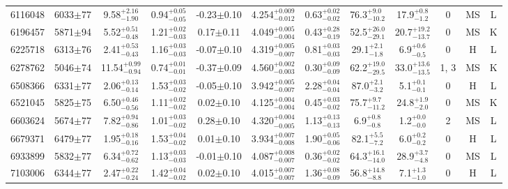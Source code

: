 \begin{longtable}{c|ccccc|ccc|ccc}
6116048 & 6033$\pm$77    & 9.58$_{-1.90}^{+2.16}$    & 0.94$_{-0.05}^{+0.05}$ & -0.23$\pm$0.10    & 4.254$_{-0.012}^{+0.009}$ & 0.63$_{-0.02}^{+0.02}$ & 76.3$_{-10.2}^{+9.0}$     & 17.9$_{-1.2}^{+0.8}$     & 0 &        MS & L \\
6196457 & 5871$\pm$94    & 5.52$_{-0.48}^{+0.51}$    & 1.21$_{-0.03}^{+0.02}$ & 0.17$\pm$0.11     & 4.049$_{-0.004}^{+0.005}$ & 0.43$_{-0.19}^{+0.28}$ & 52.5$_{-29.1}^{+26.0}$    & 20.7$_{-13.7}^{+19.2}$   & 0 &        MS & K \\
6225718 & 6313$\pm$76    & 2.41$_{-0.43}^{+0.53}$    & 1.16$_{-0.03}^{+0.03}$ & -0.07$\pm$0.10    & 4.319$_{-0.007}^{+0.005}$ & 0.81$_{-0.03}^{+0.03}$ & 29.1$_{-1.8}^{+2.1}$      & 6.9$_{-0.5}^{+0.6}$      & 0 &        H & L \\
6278762 & 5046$\pm$74    & 11.54$_{-0.94}^{+0.99}$   & 0.74$_{-0.01}^{+0.01}$ & -0.37$\pm$0.09    & 4.560$_{-0.003}^{+0.002}$ & 0.30$_{-0.09}^{+0.09}$ & 62.2$_{-29.5}^{+19.0}$    & 33.0$_{-13.5}^{+13.6}$   & 1, 3 &        MS & K \\
6508366 & 6331$\pm$77    & 2.06$_{-0.14}^{+0.13}$    & 1.53$_{-0.02}^{+0.03}$ & -0.05$\pm$0.10    & 3.942$_{-0.007}^{+0.005}$ & 2.28$_{-0.04}^{+0.04}$ & 87.0$_{-3.2}^{+2.1}$      & 5.1$_{-0.1}^{+0.1}$      & 0 &        H & L \\
6521045 & 5825$\pm$75    & 6.50$_{-0.56}^{+0.46}$    & 1.11$_{-0.02}^{+0.02}$ & 0.02$\pm$0.10     & 4.125$_{-0.004}^{+0.004}$ & 0.45$_{-0.02}^{+0.03}$ & 75.7$_{-11.2}^{+9.7}$     & 24.8$_{-2.0}^{+1.9}$     & 0 &        MS & K \\
6603624 & 5674$\pm$77    & 7.82$_{-0.86}^{+0.94}$    & 1.01$_{-0.02}^{+0.03}$ & 0.28$\pm$0.10     & 4.320$_{-0.005}^{+0.004}$ & 1.13$_{-0.13}^{+0.13}$ & 6.9$_{-0.8}^{+0.8}$       & 1.2$_{-0.0}^{+0.0}$      & 2 &        MS & L \\
6679371 & 6479$\pm$77    & 1.95$_{-0.16}^{+0.18}$    & 1.53$_{-0.02}^{+0.04}$ & 0.01$\pm$0.10     & 3.934$_{-0.008}^{+0.007}$ & 1.90$_{-0.06}^{+0.05}$ & 82.1$_{-7.2}^{+5.5}$      & 6.0$_{-0.2}^{+0.2}$      & 0 &        H & L \\
6933899 & 5832$\pm$77    & 6.34$_{-0.62}^{+0.72}$    & 1.13$_{-0.03}^{+0.03}$ & -0.01$\pm$0.10    & 4.087$_{-0.007}^{+0.008}$ & 0.36$_{-0.02}^{+0.02}$ & 64.3$_{-14.0}^{+16.1}$    & 28.9$_{-4.8}^{+3.7}$     & 0 &        MS & L \\
7103006 & 6344$\pm$77    & 2.47$_{-0.24}^{+0.22}$    & 1.42$_{-0.02}^{+0.04}$ & 0.02$\pm$0.10     & 4.015$_{-0.007}^{+0.007}$ & 1.36$_{-0.09}^{+0.08}$ & 56.8$_{-8.8}^{+14.8}$     & 7.1$_{-1.0}^{+1.3}$      & 0 &        H & L \\

\end{longtable}
